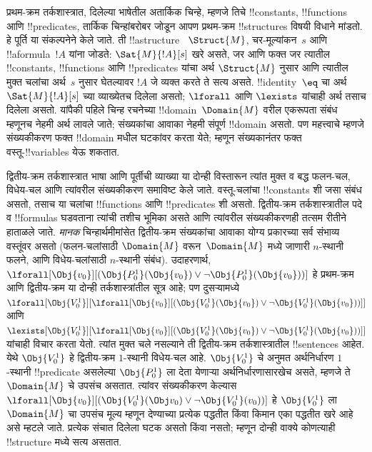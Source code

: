 \documentclass[../../../include/open-logic-section]{subfiles}
\begin{document}


प्रथम-क्रम तर्कशास्त्रात,
दिलेल्या भाषेतील
अतार्किक चिन्हे,
म्हणजे तिचे
!!{constant}s,
!!{function}s
आणि !!{predicate}s,
तार्किक चिन्हांबरोबर
जोडून आपण
प्रथम-क्रम
!!{structure}s
विषयी विधाने
मांडतो.
हे पूर्ति
या संकल्पनेने
केले जाते.
ती !!a{structure}~
$\Struct{M}$,
चर-मूल्यांकन~$s$
आणि !!a{formula}~$!A$
यांना जोडते:
$\Sat{M}{!A}[s]$
खरे असते, जर
आणि फक्त जर
त्यातील
!!{constant}s,
!!{function}s
आणि !!{predicate}s
यांचा अर्थ
$\Struct{M}$ नुसार
आणि त्यातील मुक्त
चलांचा अर्थ~$s$
नुसार घेतल्यावर
$!A$ जे व्यक्त
करते ते सत्य
असते.
!!{identity}~$\eq$
चा अर्थ
$\Sat{M}{!A}[s]$
च्या व्याख्येतच
दिलेला असतो;
$\lforall$ आणि
$\lexists$ यांचाही
अर्थ तसाच
दिलेला असतो.
यांपैकी पहिले
चिन्ह रचनेच्या
!!{domain}~$\Domain{M}$
वरील एकरूपता
संबंध म्हणूनच
नेहमी अर्थ लावले
जाते; संख्यकांचा
आवाका नेहमी
संपूर्ण !!{domain}
असतो.
पण महत्त्वाचे
म्हणजे संख्यकीकरण
फक्त !!{domain}
मधील घटकांवर
करता येते;
म्हणून संख्यकानंतर
फक्त वस्तू-!!{variable}s
येऊ शकतात.

द्वितीय-क्रम
तर्कशास्त्रात
भाषा आणि पूर्तीची
व्याख्या या दोन्ही
विस्तारून त्यांत
मुक्त व बद्ध
फलन-चल, विधेय-चल
आणि त्यांवरील
संख्यकीकरण
समाविष्ट केले
जाते.
वस्तू-चलांचा
!!{constant}s शी
जसा संबंध असतो,
तसाच या चलांचा
!!{function}s
आणि !!{predicate}s
शी असतो.
द्वितीय-क्रम
तर्कशास्त्रातील
पदे व !!{formula}s
घडवताना त्यांची
तशीच भूमिका
असते आणि
त्यांवरील
संख्यकीकरणही
तत्सम रीतीने
हाताळले जाते.
\emph{मानक}
चिन्हार्थमीमांसेत
द्वितीय-क्रम
संख्यकांचा
आवाका योग्य
प्रकारच्या सर्व
संभाव्य वस्तूंवर
असतो (फलन-चलांसाठी
$\Domain{M}$ वरून~$\Domain{M}$
मध्ये जाणारी
$n$-स्थानी फलने,
आणि विधेय-चलांसाठी
$n$-स्थानी संबंध).
उदाहरणार्थ,
$\lforall[\Obj{v_0}][(\Obj{P^1_0}(\Obj{v_0}) \lor \lnot
  \Obj{P^1_0}(\Obj{v_0}))]$
हे प्रथम-क्रम
आणि द्वितीय-क्रम
या दोन्ही
तर्कशास्त्रांतील
सूत्र आहे;
पण दुसऱ्यामध्ये
$\lforall[\Obj{V^1_0}][\lforall[\Obj{v_0}][(\Obj{V^1_0}(\Obj{v_0}) \lor
    \lnot \Obj{V^1_0}(\Obj{v_0}))]]$
आणि
$\lexists[\Obj{V^1_0}][\lforall[\Obj{v_0}][(\Obj{V^1_0}(\Obj{v_0}) \lor
    \lnot \Obj{V^1_0}(\Obj{v_0}))]]$
यांचाही विचार
करता येतो.
त्यांत मुक्त
चले नसल्याने
ती द्वितीय-क्रम
तर्कशास्त्रातील
!!{sentence}s
आहेत.
येथे $\Obj{V^1_0}$
हे द्वितीय-क्रम
$1$-स्थानी
विधेय-चल आहे.
$\Obj{V^1_0}$
चे अनुमत
अर्थनिर्धारण
$1$-स्थानी
!!{predicate}
असलेल्या
$\Obj{P^1_0}$
ला देता येणाऱ्या
अर्थनिर्धारणासारखेच
असते, म्हणजे
ते~$\Domain{M}$
चे उपसंच असतात.
त्यांवर संख्यकीकरण
केल्यास
$\lforall[\Obj{v_0}][(\Obj{V^1_0}(\Obj v_0) \lor \lnot
  \Obj{V^1_0}(v_0))]$
हे $\Obj{V^1_0}$
ला~$\Domain{M}$
चा उपसंच मूल्य
म्हणून देण्याच्या
प्रत्येक पद्धतीत
किंवा किमान
एका पद्धतीत
खरे आहे असे
म्हटले जाते.
प्रत्येक संचात
दिलेला घटक
असतो किंवा
नसतो; म्हणून
दोन्ही वाक्ये
कोणत्याही
!!{structure}
मध्ये सत्य असतात.
\end{document}

